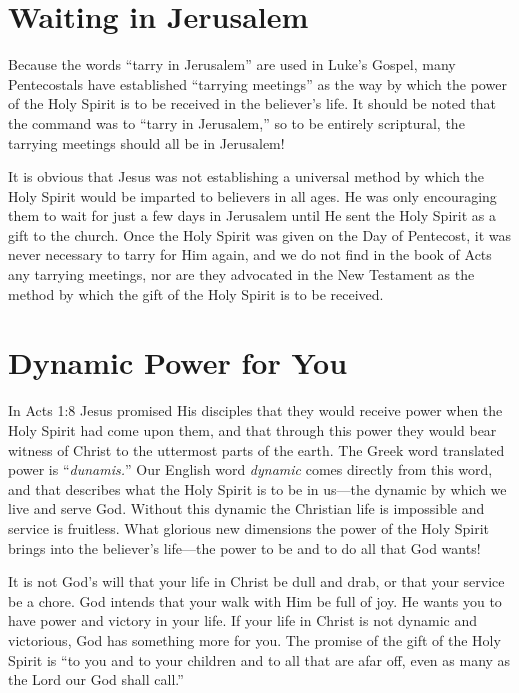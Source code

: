 \section*{Waiting in Jerusalem}

Because the words “tarry in Jerusalem” are used in
Luke’s Gospel, many Pentecostals have established “tarrying
meetings” as the way by which the power of the Holy
Spirit is to be received in the believer’s life. It should be
noted that the command was to “tarry in Jerusalem,” so to
be entirely scriptural, the tarrying meetings should all be in
Jerusalem!

It is obvious that Jesus was not establishing a universal
method by which the Holy Spirit would be imparted to
believers in all ages. He was only encouraging them to wait
for just a few days in Jerusalem until He sent the Holy Spirit
as a gift to the church. Once the Holy Spirit was given on
the Day of Pentecost, it was never necessary to tarry for
Him again, and we do not find in the book of Acts any tarrying
meetings, nor are they advocated in the New Testament
as the method by which the gift of the Holy Spirit is to be
received.


\section*{Dynamic Power for You}

In Acts 1:8 Jesus promised His disciples that they would
receive power when the Holy Spirit had come upon them,
and that through this power they would bear witness of
Christ to the uttermost parts of the earth. The Greek word
translated power is “\emph{dunamis.}” Our English word \emph{dynamic}
comes directly from this word, and that describes what
the Holy Spirit is to be in us—the dynamic by which we
live and serve God. Without this dynamic the Christian life
is impossible and service is fruitless. What glorious new
dimensions the power of the Holy Spirit brings into the
believer’s life—the power to be and to do all that God
wants!

It is not God’s will that your life in Christ be dull and
drab, or that your service be a chore. God intends that your
walk with Him be full of joy. He wants you to have power
and victory in your life. If your life in Christ is not dynamic
and victorious, God has something more for you. The promise
of the gift of the Holy Spirit is “to you and to your children
and to all that are afar off, even as many as the Lord
our God shall call.”



